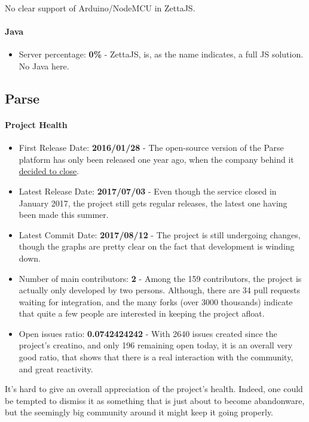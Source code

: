 \documentclass{article}
\begin{document}
No clear support of Arduino/NodeMCU in ZettaJS.

\paragraph{Java} 

\begin{itemize}
\item Server percentage: \textbf{0\%} - ZettaJS, is, as the name indicates, a full JS solution. No Java here.
\end{itemize}

\subsection{Parse}

\paragraph{Project Health}

\begin{itemize}
\item First Release Date: \textbf{2016/01/28} - The open-source version of the Parse platform has only been released one year ago, when the company behind it \href{http://blog.parse.com/announcements/moving-on/}{decided to close}.
\item Latest Release Date: \textbf{2017/07/03} - Even though the service closed in January 2017, the project still gets regular releases, the latest one having been made this summer.
\item Latest Commit Date: \textbf{2017/08/12} - The project is still undergoing changes, though the graphs are pretty clear on the fact that development is winding down.
\item Number of main contributors: \textbf{2} - Among the 159 contributors, the project is actually only developed by two persons. Although, there are 34 pull requests waiting for integration, and the many forks (over 3000 thousands) indicate that quite a few people are interested in keeping the project afloat.
\item Open issues ratio: \textbf{0.0742424242} - With 2640 issues created since the project's creatino, and only 196 remaining open today, it is an overall very good ratio, that shows that there is a real interaction with the community, and great reactivity.
\end{itemize}

It's hard to give an overall appreciation of the project's health. Indeed, one could be tempted to dismiss it as something that is just about to become abandonware, but the seemingly big community around it might keep it going properly.
\end{document}

